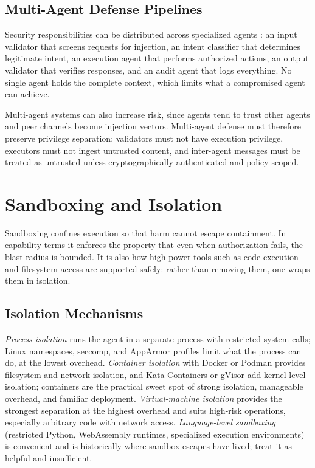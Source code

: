 \documentclass[11pt]{book}
\begin{document}
\subsection{Multi-Agent Defense Pipelines}

Security responsibilities can be distributed across specialized agents \cite{multiagentdefense2025}: an input validator that screens requests for injection, an intent classifier that determines legitimate intent, an execution agent that performs authorized actions, an output validator that verifies responses, and an audit agent that logs everything. No single agent holds the complete context, which limits what a compromised agent can achieve.

Multi-agent systems can also increase risk, since agents tend to trust other agents and peer channels become injection vectors. Multi-agent defense must therefore preserve privilege separation: validators must not have execution privilege, executors must not ingest untrusted content, and inter-agent messages must be treated as untrusted unless cryptographically authenticated and policy-scoped.

\section{Sandboxing and Isolation}

Sandboxing confines execution so that harm cannot escape containment. In capability terms it enforces the property that even when authorization fails, the blast radius is bounded. It is also how high-power tools such as code execution and filesystem access are supported safely: rather than removing them, one wraps them in isolation.

\subsection{Isolation Mechanisms}

\textit{Process isolation} runs the agent in a separate process with restricted system calls; Linux namespaces, seccomp, and AppArmor profiles limit what the process can do, at the lowest overhead. \textit{Container isolation} with Docker or Podman provides filesystem and network isolation, and Kata Containers or gVisor add kernel-level isolation; containers are the practical sweet spot of strong isolation, manageable overhead, and familiar deployment. \textit{Virtual-machine isolation} provides the strongest separation at the highest overhead and suits high-risk operations, especially arbitrary code with network access. \textit{Language-level sandboxing} (restricted Python, WebAssembly runtimes, specialized execution environments) is convenient and is historically where sandbox escapes have lived; treat it as helpful and insufficient.
\end{document}
